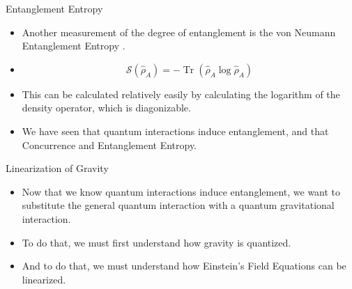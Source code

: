 \documentclass[12pt,aspectratio=1610]{beamer}
\DeclareMathOperator{\Tr}{Tr}
\begin{document}
\begin{frame}{Entanglement Entropy}
    \begin{itemize}
        \item Another measurement of the degree of entanglement is the von Neumann Entanglement Entropy \citep{Bala_2012, PhysRevA.101.052110, suddho}.
        \item \begin{equation*}
            \mathcal{S}(\hat{\rho}_A) = -\Tr(\hat{\rho}_A \log{\hat{\rho}_A})
        \end{equation*}
        \item This can be calculated relatively easily by calculating the logarithm of the density operator, which is diagonizable.
        \item We have seen that quantum interactions induce entanglement, and that Concurrence and Entanglement Entropy.
    \end{itemize}
\end{frame}

\begin{frame}{Linearization of Gravity}
    \begin{itemize}
        \item Now that we know quantum interactions induce entanglement, we want to substitute the general quantum interaction with a quantum gravitational interaction.
        \item To do that, we must first understand how gravity is quantized.
        \item And to do that, we must understand how Einstein's Field Equations can be linearized.
    \end{itemize}
\end{frame}
\end{document}
